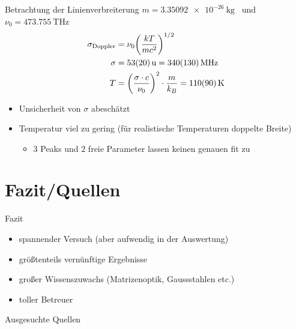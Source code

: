 \documentclass[10pt, aspectratio=169]{beamer}
\begin{document}
\begin{frame}{Betrachtung der Linienverbreiterung}
  \(m=\SI{3.35092e-26}{\kg}\)~\cite{IUPAC2013} und
  \(\nu_0=\SI{473.755}{\tera\hertz}\) ~\cite[226]{Sigrist2018}
  \begin{align}
    \sigma_{\text{Doppler}} & = \nu_0\qty(\frac{kT}{mc^2})^{1/2} \\
    \sigma & = \SI{53\pm 20}{u} = \SI{340\pm 130}{\mega\hertz} \\
    T & = \qty(\frac{\sigma\cdot c}{\nu_0})^2\cdot \frac{m}{k_B}=\SI{110\pm 90}{\kelvin}
  \end{align}
  \begin{itemize}
  \item<1-> Unsicherheit von \(\sigma\) abesch\"atzt
  \item<2-> Temperatur viel zu gering (f\"ur realistische Temperaturen
    doppelte Breite)
    \begin{itemize}
    \item \(3\) Peaks und \(2\) freie Parameter lassen keinen genauen
      fit zu
    \end{itemize}
  \end{itemize}
   
\end{frame}




\section{Fazit/Quellen}

\begin{frame}{Fazit}
  \begin{itemize}
  \item<1-> spannender Versuch (aber aufwendig in der Auswertung)
  \item<2-> gr\"o\ss{}tenteils vern\"unftige Ergebnisse
  \item<3-> gro\ss{}er Wissenszuwachs (Matrizenoptik, Gaussstahlen
    etc.)
  \item<4-> toller Betreuer
  \end{itemize}
\end{frame}

\begin{frame}[allowframebreaks]{Ausgesuchte Quellen}
  \printbibliography
\end{frame}
\end{document}
